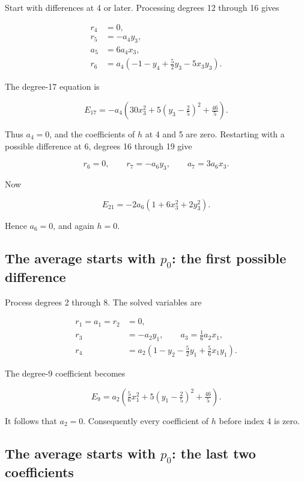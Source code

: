Start with differences at 4 or later. Processing degrees 12 through 16
gives

\[
\begin{aligned}
r_4&=0,\\
r_5&=-a_4y_3,\\
a_5&=6a_4x_3,\\
r_6&=a_4\left(-1-y_4+\tfrac52y_3-5x_3y_3\right).
\end{aligned}
\]

The degree-17 equation is

\[
E_{17}=-a_4\left(30x_3^2+5(y_3-\tfrac25)^2+\tfrac{46}{5}\right). \tag{9}
\]

Thus \(a_4=0\), and the coefficients of \(h\) at 4 and 5 are zero.
Restarting with a possible difference at 6, degrees 16 through 19 give

\[
r_6=0,\qquad r_7=-a_6y_3,\qquad a_7=3a_6x_3.
\]

Now

\[
E_{21}=-2a_6(1+6x_3^2+2y_3^2). \tag{10}
\]

Hence \(a_6=0\), and again \(h=0\).

\subsection{\texorpdfstring{The average starts with \(p_0\): the first
possible
difference}{The average starts with p\_0: the first possible difference}}\label{the-average-starts-with-p_0-the-first-possible-difference}

Process degrees 2 through 8. The solved variables are

\[
\begin{aligned}
r_1=a_1=r_2&=0,\\
r_3&=-a_2y_1,\qquad a_3=\tfrac16a_2x_1,\\
r_4&=a_2\left(1-y_2-\tfrac52y_1+\tfrac56x_1y_1\right).
\end{aligned}
\]

The degree-9 coefficient becomes

\[
E_9=a_2\left(\tfrac56x_1^2+5(y_1-\tfrac25)^2+\tfrac{46}{5}\right). \tag{11}
\]

It follows that \(a_2=0\). Consequently every coefficient of \(h\)
before index 4 is zero.

\subsection{\texorpdfstring{The average starts with \(p_0\): the last
two
coefficients}{The average starts with p\_0: the last two coefficients}}\label{the-average-starts-with-p_0-the-last-two-coefficients}

